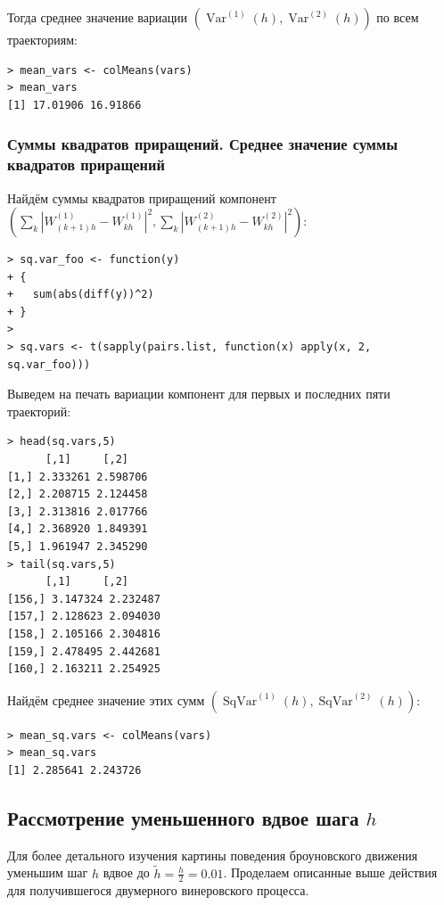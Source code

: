 \documentclass[14pt,a4paper]{scrartcl}
\begin{document}
Тогда среднее значение вариации $\left(\operatorname{Var}^{(1)}(h), \operatorname{Var}^{(2)}(h)\right)$ по всем траекториям:

\begin{verbatim}
> mean_vars <- colMeans(vars)
> mean_vars
[1] 17.01906 16.91866
\end{verbatim}

\pagebreak

\subsubsection{Суммы квадратов приращений. Среднее значение суммы квадратов приращений}

Найдём суммы квадратов приращений компонент \\${\left(\sum\limits_{k}\left|W_{(k+1) h}^{(1)}-W_{k h}^{(1)}\right|^2, \sum\limits_{k}\left|W_{(k+1) h}^{(2)}-W_{k h}^{(2)}\right|^2\right)}$:

\begin{verbatim}
> sq.var_foo <- function(y)
+ {
+   sum(abs(diff(y))^2)
+ }
> 
> sq.vars <- t(sapply(pairs.list, function(x) apply(x, 2, sq.var_foo)))
\end{verbatim}


Выведем на печать вариации компонент для первых и последних пяти траекторий:
\begin{verbatim}
> head(sq.vars,5)
	  [,1]     [,2]
[1,] 2.333261 2.598706
[2,] 2.208715 2.124458
[3,] 2.313816 2.017766
[4,] 2.368920 1.849391
[5,] 1.961947 2.345290
> tail(sq.vars,5)
	  [,1]     [,2]
[156,] 3.147324 2.232487
[157,] 2.128623 2.094030
[158,] 2.105166 2.304816
[159,] 2.478495 2.442681
[160,] 2.163211 2.254925
\end{verbatim}

Найдём среднее значение этих сумм $(\operatorname{SqVar}^{(1)}(h), \operatorname{SqVar}^{(2)}(h))$:

\begin{verbatim}
> mean_sq.vars <- colMeans(vars)
> mean_sq.vars
[1] 2.285641 2.243726
\end{verbatim}


\pagebreak

\subsection{Рассмотрение уменьшенного вдвое шага $h$}\label{4}
Для более детального изучения картины поведения броуновского движения уменьшим шаг $h$ вдвое до $\tilde{h} = \frac{h}{2} = 0.01$. Проделаем описанные выше действия для получившегося двумерного винеровского процесса.
\end{document}
